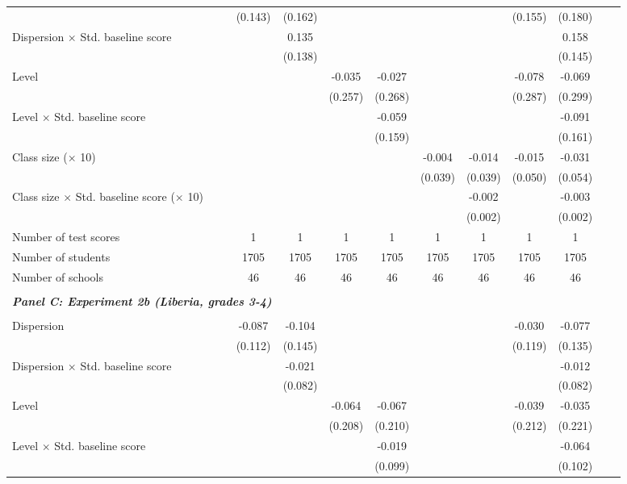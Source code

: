 \begin{center}
\begin{scriptsize}
\begin{threeparttable}
\begin{tabular} {@{} l l c c c c c c c c c c  @{}}
                 &  & (0.143) & (0.162) &  &  &  &  & (0.155) & (0.180) \\
Dispersion $\times$ Std. baseline score &  &  & 0.135 &  &  &  &  &  & 0.158 \\
                 &  &  & (0.138) &  &  &  &  &  & (0.145) \\
Level &  &  &  & -0.035 & -0.027 &  &  & -0.078 & -0.069 \\
                 &  &  &  & (0.257) & (0.268) &  &  & (0.287) & (0.299) \\
Level $\times$ Std. baseline score &  &  &  &  & -0.059 &  &  &  & -0.091 \\
                 &  &  &  &  & (0.159) &  &  &  & (0.161) \\
Class size ($\times$ 10) &  &  &  &  &  & -0.004 & -0.014 & -0.015 & -0.031 \\
                 &  &  &  &  &  & (0.039) & (0.039) & (0.050) & (0.054) \\
Class size $\times$ Std. baseline score ($\times$ 10) &  &  &  &  &  &  & -0.002 &  & -0.003 \\
                 &  &  &  &  &  &  & (0.002) &  & (0.002) \\
\midrule
Number of test scores &  & 1 & 1 & 1 & 1 & 1 & 1 & 1 & 1 \\
Number of students &  & 1705 & 1705 & 1705 & 1705 & 1705 & 1705 & 1705 & 1705 \\
Number of schools &  & 46 & 46 & 46 & 46 & 46 & 46 & 46 & 46 \\
 \midrule
\\
\multicolumn{3}{l}{\textbf{\textit{Panel C: Experiment 2b (Liberia, grades 3-4)}}} \\
\\
Dispersion &  & -0.087 & -0.104 &  &  &  &  & -0.030 & -0.077 \\
                 &  & (0.112) & (0.145) &  &  &  &  & (0.119) & (0.135) \\
Dispersion $\times$ Std. baseline score &  &  & -0.021 &  &  &  &  &  & -0.012 \\
                 &  &  & (0.082) &  &  &  &  &  & (0.082) \\
Level &  &  &  & -0.064 & -0.067 &  &  & -0.039 & -0.035 \\
                 &  &  &  & (0.208) & (0.210) &  &  & (0.212) & (0.221) \\
Level $\times$ Std. baseline score &  &  &  &  & -0.019 &  &  &  & -0.064 \\
                 &  &  &  &  & (0.099) &  &  &  & (0.102) \\

\end{tabular}
\end{threeparttable}
\end{scriptsize}
\end{center}

